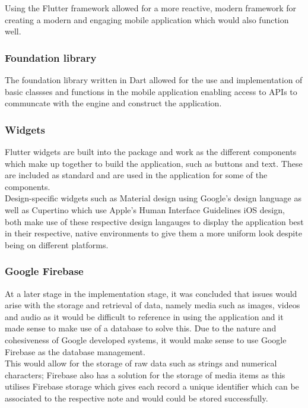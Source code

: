\documentclass[oneside]{report}
\begin{document}
Using the Flutter framework allowed for a more reactive, modern framework for creating a modern and engaging mobile application which would also function well.

		\subsubsection{Foundation library}
The foundation library written in Dart allowed for the use and implementation of basic classses and functions in the mobile application enabling access to APIs to communcate with the engine and construct the application.

		\subsubsection{Widgets}
Flutter widgets are built into the package and work as the different components which make up together to build the application, such as buttons and text. These are included as standard and are used in the application for some of the components.\\

Design-specific widgets such as Material design using Google's design language as well as Cupertino which use Apple's Human Interface Guidelines iOS design, both make use of these respective design langauges to display the application best in their respective, native environments to give them a more uniform look despite being on different platforms.
	
		\subsubsection{Google Firebase}
At a later stage in the implementation stage, it was concluded that issues would arise with the storage and retrieval of data, namely media such as images, videos and audio as it would be difficult to reference in using the application and it made sense to make use of a database to solve this. Due to the nature and cohesiveness of Google developed systems, it would make sense to use Google Firebase as the database management.\\

This would allow for the storage of raw data such as strings and numerical characters; Firebase also has a solution for the storage of media items as this utilises Firebase storage which gives each record a unique identifier which can be associated to the respective note and would could be stored successfully.
\end{document}
